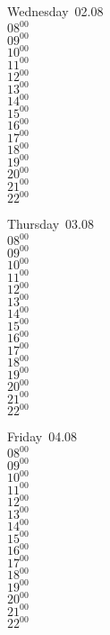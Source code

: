 \documentclass[11pt,a4paper]{book}\usepackage[]{graphicx}\usepackage[]{color}
\begin{document}
\begin{weekdaybox}
  Wednesday~02.08\\
  { 
  \vfill
  $08^{00}$\\
$09^{00}$\\
$10^{00}$\\
$11^{00}$\\
$12^{00}$\\
$13^{00}$\\
$14^{00}$\\
$15^{00}$\\
$16^{00}$\\
$17^{00}$\\
$18^{00}$\\
$19^{00}$\\
$20^{00}$\\
$21^{00}$\\
$22^{00}$\\
  }
\end{weekdaybox}
\clearpage
\begin{headerbox}
\end{headerbox}
\begin{weekdaybox}
  Thursday~03.08\\
  { 
  \vfill
  $08^{00}$\\
$09^{00}$\\
$10^{00}$\\
$11^{00}$\\
$12^{00}$\\
$13^{00}$\\
$14^{00}$\\
$15^{00}$\\
$16^{00}$\\
$17^{00}$\\
$18^{00}$\\
$19^{00}$\\
$20^{00}$\\
$21^{00}$\\
$22^{00}$\\
  }
\end{weekdaybox} 
\begin{weekdaybox}
  Friday~04.08\\
  { 
  \vfill
  $08^{00}$\\
$09^{00}$\\
$10^{00}$\\
$11^{00}$\\
$12^{00}$\\
$13^{00}$\\
$14^{00}$\\
$15^{00}$\\
$16^{00}$\\
$17^{00}$\\
$18^{00}$\\
$19^{00}$\\
$20^{00}$\\
$21^{00}$\\
$22^{00}$\\
  }
\end{weekdaybox}
\end{document}
